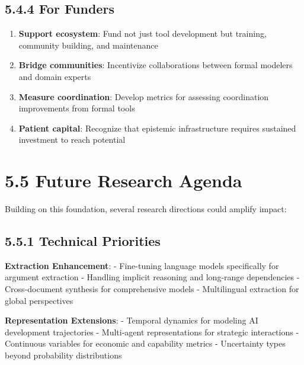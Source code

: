 \documentclass[
  11pt,
  letterpaper,
]{book}
\begin{document}
\subsection*{5.4.4 For Funders}\label{sec-funder-recommendations}

\begin{enumerate}
\def\labelenumi{\arabic{enumi}.}
\item
  \textbf{Support ecosystem}: Fund not just tool development but
  training, community building, and maintenance
\item
  \textbf{Bridge communities}: Incentivize collaborations between formal
  modelers and domain experts
\item
  \textbf{Measure coordination}: Develop metrics for assessing
  coordination improvements from formal tools
\item
  \textbf{Patient capital}: Recognize that epistemic infrastructure
  requires sustained investment to reach potential
\end{enumerate}

\section*{5.5 Future Research Agenda}\label{sec-future-research-agenda}


Building on this foundation, several research directions could amplify
impact:

\subsection*{5.5.1 Technical Priorities}\label{sec-technical-priorities}

\textbf{Extraction Enhancement}: - Fine-tuning language models
specifically for argument extraction - Handling implicit reasoning and
long-range dependencies - Cross-document synthesis for comprehensive
models - Multilingual extraction for global perspectives

\textbf{Representation Extensions}: - Temporal dynamics for modeling AI
development trajectories - Multi-agent representations for strategic
interactions - Continuous variables for economic and capability metrics
- Uncertainty types beyond probability distributions
\end{document}
